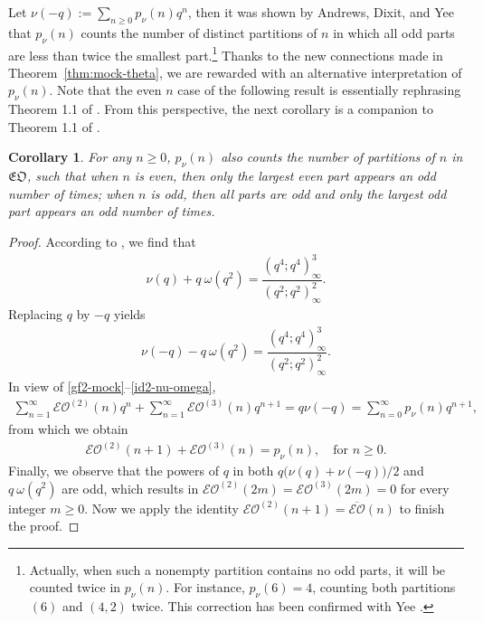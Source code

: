 \documentclass[12pt,reqno]{amsart}
\numberwithin{equation}{section}
\theoremstyle{plain}
\newtheorem{corollary}[theorem]{Corollary}
\theoremstyle{definition}
\def\EO{\mathcal{EO}}
\begin{document}
Let $\nu(-q):=\sum_{n\ge 0}p_{\nu}(n)q^n$, then it was shown by Andrews, Dixit, and Yee~\cite[Theorem.~4.1]{ADY}
that $p_{\nu}(n)$ counts the number of distinct partitions of $n$ in which all odd parts are less than twice the
smallest part.\footnote{Actually, when such a nonempty partition contains no odd parts, it will be counted twice
in $p_{\nu}(n)$. For instance, $p_{\nu}(6)=4$, counting both partitions $(6)$ and $(4,2)$ twice. This correction
has been confirmed with Yee \cite{Yeep}.} Thanks to the new connections made in Theorem~\ref{thm:mock-theta}, we
are rewarded with an alternative interpretation of $p_{\nu}(n)$. Note that the even $n$ case of the following
result is essentially rephrasing Theorem 1.1 of \cite{and2}. From this perspective, the next corollary is a
companion to Theorem 1.1 of \cite{and2}.

\begin{corollary}
For any $n\ge 0$, $p_\nu(n)$ also counts the number of partitions of $n$ in $\mathfrak{EO}$, such that when $n$
is even, then only the largest even part appears an odd number of times; when $n$ is odd, then all parts are odd
and only the largest odd part appears an odd number of times.
\end{corollary}

\begin{proof}
According to \cite[p. 72]{Wat}, we find that
\begin{align}\label{id1-nu-omega}
\nu(q)+q\!\:\omega(q^2)=\dfrac{(q^4;q^4)_\infty^3}{(q^2;q^2)_\infty^2}.
\end{align}
Replacing $q$ by $-q$ yields
\begin{align}\label{id2-nu-omega}
\nu(-q)-q\!\:\omega(q^2)=\dfrac{(q^4;q^4)_\infty^3}{(q^2;q^2)_\infty^2}.
\end{align}
In view of \eqref{gf2-mock}--\eqref{id2-nu-omega},
\begin{align*}
\sum_{n=1}^\infty\mathcal{EO}^{(2)}(n)q^n+\sum_{n=1}^\infty\mathcal{EO}^{(3)}(n)q^{n+1}
=q\nu(-q)=\sum_{n=0}^\infty p_\nu(n)q^{n+1},
\end{align*}
from which we obtain
\begin{align*}
\mathcal{EO}^{(2)}(n+1)+\mathcal{EO}^{(3)}(n)=p_\nu(n),\quad \text{for }n\ge 0.
\end{align*}
Finally, we observe that the powers of $q$ in both $q\big(\nu(q)+\nu(-q)\big)/2$ and $q\!\:\omega(q^2)$ are odd,
which results in $\EO^{(2)}(2m)=\EO^{(3)}(2m)=0$ for every integer $m\ge 0$. Now we apply the identity
$\mathcal{EO}^{(2)}(n+1)=\overline{\mathcal{EO}}(n)$ to finish the proof.
\end{proof}
\end{document}
